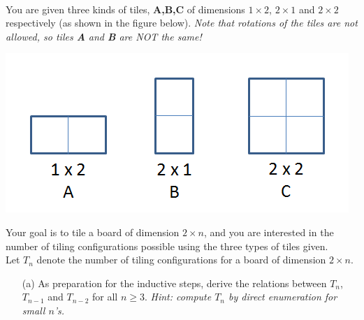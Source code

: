 \documentclass[11pt]{article}
\newif\ifsolutions
\renewcommand{\answer}[1]{{\color{mydarkblue}\textbf{Solutions: }#1}}
\begin{document}
\begin{qunlist}
\pagebreak

 \\
You are given three kinds of tiles, \textbf{A,B,C} of dimensions $1 \times 2$, $2 \times 1$
and $2 \times 2$ respectively (as shown in the figure below).
\textit{Note that rotations of the tiles are not allowed, so tiles \textbf{A} and \textbf{B} are NOT the same!}

\begin{minipage}{\linewidth}
\centering
\includegraphics[scale=0.6]{resources/figures/tile.png}
\end{minipage}

Your goal is to tile a board of dimension $2 \times n$, and you are interested in the number of
tiling configurations possible using the three types of tiles given. \\
Let $T_n$ denote the number of tiling configurations for a board of dimension $2 \times n$.
\begin{itemize}
\item[(a)] As preparation for the inductive steps, derive the relations between $T_n$, $T_{n-1}$ 
and $T_{n-2}$ for all $n \geq 3$. \textit{Hint: compute $T_n$ by direct enumeration for small $n$'s.}

\ifsolutions
\answer{
\[ T_n = T_{n-1} + 2T_{n-2}, \quad \text{for all } n \geq 3 \]
We enumerate the tilings for a $2 \times n$ board by considering three cases depending on
the type of tile covering the bottom square of the first column. 
\begin{itemize}
\item[(i)] The tile is of type \textbf{A}: 
then the first two columns of the board must be tiled with \textbf{AA}.
The remaining $2 \times (n-2)$ board can be tiled in $T_{n-2}$ ways.
\item[(ii)] The tile is of type \textbf{B}: the first column is tiled with \textbf{B}, and
the remaining $2 \times (n-1)$ board can be tiled in $T_{n-1}$ ways.
\item[(iii)] The tile is of type \textbf{C}: the first two columns of the board are tiled with \textbf{C}, 
and the remaining $2 \times (n-2)$ board can be tiled in $T_{n-2}$ ways.
\end{itemize}
Note that the three cases are exhaustive and mutually exclusive. The number of tilings for a $2 \times n$
board therefore satisfies the recurrence relation as proposed.
}
\fi



\end{itemize}
\end{qunlist}
\end{document}
